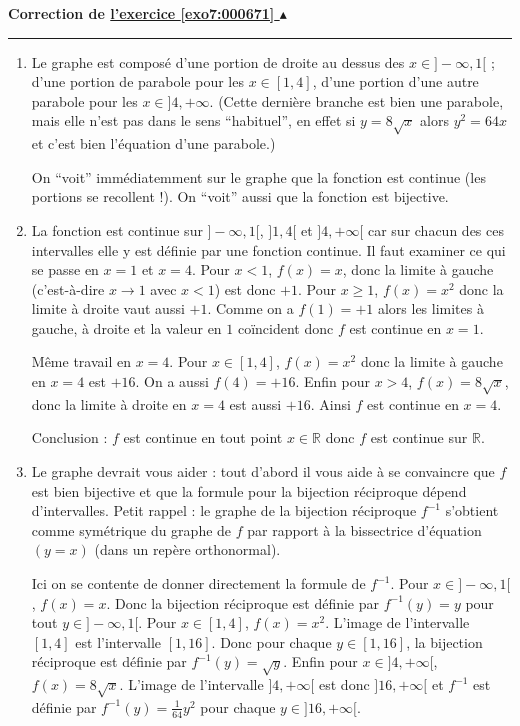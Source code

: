 \documentclass[11pt,a4paper]{article}
\newcommand{\Rr}{\mathbb{R}} \newcommand{\R}{\mathbb{R}}
\renewcommand{\ge}{\geqslant} \renewcommand{\geq}{\geqslant}
\newcounter{exo}
\newcommand{\correction}[1]{\hypertarget{cor7:#1}{}\label{cor7:#1}{\bf Correction de \hyperlink{exo7:#1}{l'exercice \ref{exo7:#1} $\blacktriangle$}}\vspace{1mm}\hrule\vspace{1mm}}
\begin{document}
\correction{000671}
\begin{enumerate}
 \item Le graphe est composé d'une portion de droite au dessus des $x \in ]-\infty,1[$ ;
d'une portion de parabole pour les $x \in [1,4]$, d'une portion d'une autre parabole pour les 
$x \in ]4,+\infty$. (Cette dernière branche est bien une parabole, mais elle n'est pas dans le sens ``habituel'',
en effet si $y=8\sqrt x$ alors $y^2 = 64 x$ et c'est bien l'équation d'une parabole.)

On ``voit'' immédiatemment sur le graphe que la fonction est continue (les portions se recollent !).
On ``voit'' aussi que la fonction est bijective.

 \item La fonction est continue sur $]-\infty,1[$, $]1,4[$ et $]4,+\infty[$ car sur chacun des ces intervalles elle
y est définie par une fonction continue. Il faut examiner ce qui se passe en $x=1$ et $x=4$.
Pour $x<1$, $f(x)=x$, donc  la limite à gauche (c'est-à-dire $x\to 1$ avec $x<1$) est donc $+1$.
Pour $x\ge 1$, $f(x) = x^2$ donc la limite à droite vaut aussi $+1$. 
Comme on a $f(1) = +1$ alors les limites à gauche, à droite et la valeur en $1$ coïncident donc $f$
est continue en $x=1$.

Même travail en $x= 4$. Pour $x \in [1,4]$, $f(x) = x^2$ donc la limite à gauche en $x=4$ est $+16$.
On a aussi $f(4)=+16$. Enfin pour $x>4$, $f(x) = 8 \sqrt x$, donc la limite à droite en $x=4$ est aussi $+16$.
Ainsi $f$ est continue en $x=4$.

Conclusion : $f$ est continue en tout point $x \in \Rr$ donc $f$ est continue sur $\Rr$.
 
 \item Le graphe devrait vous aider : tout d'abord il vous aide à se convaincre que $f$ est bien bijective
et que la formule pour la bijection réciproque dépend d'intervalles. Petit rappel : le graphe de la bijection réciproque $f^{-1}$ s'obtient
comme symétrique du graphe de $f$ par rapport à la bissectrice d'équation $(y=x)$ (dans un repère orthonormal).



Ici on se contente de donner directement la formule de $f^{-1}$. 
Pour $x \in  ]-\infty,1[$, $f(x)=x$. Donc la bijection réciproque est définie par $f^{-1}(y)=y$ pour tout $y \in  ]-\infty,1[$.
Pour $x \in [1,4]$, $f(x)=x^2$. L'image de l'intervalle $[1,4]$ est l'intervalle $[1,16]$. Donc pour chaque $y \in [1,16]$,
la bijection réciproque est définie par $f^{-1}(y) = \sqrt y$. 
Enfin pour $x\in]4,+\infty[$, $f(x) = 8\sqrt x$. L'image de l'intervalle $]4,+\infty[$ est donc $]16,+\infty[$
et $f^{-1}$ est définie par $f^{-1}(y) = \frac{1}{64} y^2$ pour chaque $y \in ]16,+\infty[$.


\end{enumerate}
\end{document}
